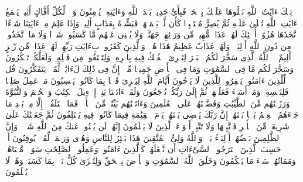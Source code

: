 تِلۡكَ ءَایَٰتُ ٱللَّهِ نَتۡلُوهَا عَلَیۡكَ بِٱلۡحَقِّۖ فَبِأَیِّ حَدِیثِۭ بَعۡدَ ٱللَّهِ وَءَایَٰتِهِۦ یُؤۡمِنُونَ%
\stopbuffer%
\startbuffer[\q:45:7]
وَیۡلࣱ لِّكُلِّ أَفَّاكٍ أَثِیمࣲ%
\stopbuffer%
\startbuffer[\q:45:8]
یَسۡمَعُ ءَایَٰتِ ٱللَّهِ تُتۡلَىٰ عَلَیۡهِ ثُمَّ یُصِرُّ مُسۡتَكۡبِرࣰا كَأَن لَّمۡ یَسۡمَعۡهَاۖ فَبَشِّرۡهُ بِعَذَابٍ أَلِیمࣲ%
\stopbuffer%
\startbuffer[\q:45:9]
وَإِذَا عَلِمَ مِنۡ ءَایَٰتِنَا شَیۡءًا ٱتَّخَذَهَا هُزُوًاۚ أُو۟لَٰۤئِكَ لَهُمۡ عَذَابࣱ مُّهِینࣱ%
\stopbuffer%
\startbuffer[\q:45:10]
مِّن وَرَاۤئِهِمۡ جَهَنَّمُۖ وَلَا یُغۡنِی عَنۡهُم مَّا كَسَبُوا۟ شَیۡءࣰا وَلَا مَا ٱتَّخَذُوا۟ مِن دُونِ ٱللَّهِ أَوۡلِیَاۤءَۖ وَلَهُمۡ عَذَابٌ عَظِیمٌ%
\stopbuffer%
\startbuffer[\q:45:11]
هَٰذَا هُدࣰىۖ وَٱلَّذِینَ كَفَرُوا۟ بِءَایَٰتِ رَبِّهِمۡ لَهُمۡ عَذَابࣱ مِّن رِّجۡزٍ أَلِیمٌ%
\stopbuffer%
\startbuffer[\q:45:12]
۞ ٱللَّهُ ٱلَّذِی سَخَّرَ لَكُمُ ٱلۡبَحۡرَ لِتَجۡرِیَ ٱلۡفُلۡكُ فِیهِ بِأَمۡرِهِۦ وَلِتَبۡتَغُوا۟ مِن فَضۡلِهِۦ وَلَعَلَّكُمۡ تَشۡكُرُونَ%
\stopbuffer%
\startbuffer[\q:45:13]
وَسَخَّرَ لَكُم مَّا فِی ٱلسَّمَٰوَٰتِ وَمَا فِی ٱلۡأَرۡضِ جَمِیعࣰا مِّنۡهُۚ إِنَّ فِی ذَٰلِكَ لَءَایَٰتࣲ لِّقَوۡمࣲ یَتَفَكَّرُونَ%
\stopbuffer%
\startbuffer[\q:45:14]
قُل لِّلَّذِینَ ءَامَنُوا۟ یَغۡفِرُوا۟ لِلَّذِینَ لَا یَرۡجُونَ أَیَّامَ ٱللَّهِ لِیَجۡزِیَ قَوۡمَۢا بِمَا كَانُوا۟ یَكۡسِبُونَ%
\stopbuffer%
\startbuffer[\q:45:15]
مَنۡ عَمِلَ صَٰلِحࣰا فَلِنَفۡسِهِۦۖ وَمَنۡ أَسَاۤءَ فَعَلَیۡهَاۖ ثُمَّ إِلَىٰ رَبِّكُمۡ تُرۡجَعُونَ%
\stopbuffer%
\startbuffer[\q:45:16]
وَلَقَدۡ ءَاتَیۡنَا بَنِیۤ إِسۡرَٰۤءِیلَ ٱلۡكِتَٰبَ وَٱلۡحُكۡمَ وَٱلنُّبُوَّةَ وَرَزَقۡنَٰهُم مِّنَ ٱلطَّیِّبَٰتِ وَفَضَّلۡنَٰهُمۡ عَلَى ٱلۡعَٰلَمِینَ%
\stopbuffer%
\startbuffer[\q:45:17]
وَءَاتَیۡنَٰهُم بَیِّنَٰتࣲ مِّنَ ٱلۡأَمۡرِۖ فَمَا ٱخۡتَلَفُوۤا۟ إِلَّا مِنۢ بَعۡدِ مَا جَاۤءَهُمُ ٱلۡعِلۡمُ بَغۡیَۢا بَیۡنَهُمۡۚ إِنَّ رَبَّكَ یَقۡضِی بَیۡنَهُمۡ یَوۡمَ ٱلۡقِیَٰمَةِ فِیمَا كَانُوا۟ فِیهِ یَخۡتَلِفُونَ%
\stopbuffer%
\startbuffer[\q:45:18]
ثُمَّ جَعَلۡنَٰكَ عَلَىٰ شَرِیعَةࣲ مِّنَ ٱلۡأَمۡرِ فَٱتَّبِعۡهَا وَلَا تَتَّبِعۡ أَهۡوَاۤءَ ٱلَّذِینَ لَا یَعۡلَمُونَ%
\stopbuffer%
\startbuffer[\q:45:19]
إِنَّهُمۡ لَن یُغۡنُوا۟ عَنكَ مِنَ ٱللَّهِ شَیۡءࣰاۚ وَإِنَّ ٱلظَّٰلِمِینَ بَعۡضُهُمۡ أَوۡلِیَاۤءُ بَعۡضࣲۖ وَٱللَّهُ وَلِیُّ ٱلۡمُتَّقِینَ%
\stopbuffer%
\startbuffer[\q:45:20]
هَٰذَا بَصَٰۤئِرُ لِلنَّاسِ وَهُدࣰى وَرَحۡمَةࣱ لِّقَوۡمࣲ یُوقِنُونَ%
\stopbuffer%
\startbuffer[\q:45:21]
أَمۡ حَسِبَ ٱلَّذِینَ ٱجۡتَرَحُوا۟ ٱلسَّیِّءَاتِ أَن نَّجۡعَلَهُمۡ كَٱلَّذِینَ ءَامَنُوا۟ وَعَمِلُوا۟ ٱلصَّٰلِحَٰتِ سَوَاۤءࣰ مَّحۡیَاهُمۡ وَمَمَاتُهُمۡۚ سَاۤءَ مَا یَحۡكُمُونَ%
\stopbuffer%
\startbuffer[\q:45:22]
وَخَلَقَ ٱللَّهُ ٱلسَّمَٰوَٰتِ وَٱلۡأَرۡضَ بِٱلۡحَقِّ وَلِتُجۡزَىٰ كُلُّ نَفۡسِۭ بِمَا كَسَبَتۡ وَهُمۡ لَا یُظۡلَمُونَ%
